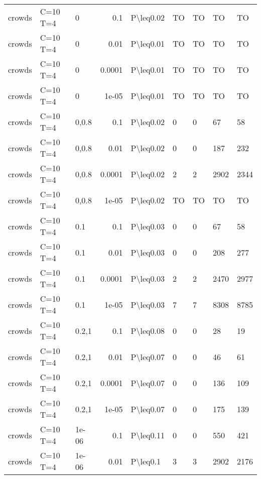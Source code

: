 \begin{longtable}{lllrlllll}
 crowds        & C=10 T=4  & 0     & 0.1    & P\textbackslash{}leq0.02  & TO   & TO   & TO       & TO      \\
 crowds        & C=10 T=4  & 0     & 0.01   & P\textbackslash{}leq0.01  & TO   & TO   & TO       & TO      \\
 crowds        & C=10 T=4  & 0     & 0.0001 & P\textbackslash{}leq0.01  & TO   & TO   & TO       & TO      \\
 crowds        & C=10 T=4  & 0     & 1e-05  & P\textbackslash{}leq0.01  & TO   & TO   & TO       & TO      \\
 crowds        & C=10 T=4  & 0,0.8 & 0.1    & P\textbackslash{}leq0.02  & 0    & 0    & 67       & 58      \\
 crowds        & C=10 T=4  & 0,0.8 & 0.01   & P\textbackslash{}leq0.02  & 0    & 0    & 187      & 232     \\
 crowds        & C=10 T=4  & 0,0.8 & 0.0001 & P\textbackslash{}leq0.02  & 2    & 2    & 2902     & 2344    \\
 crowds        & C=10 T=4  & 0,0.8 & 1e-05  & P\textbackslash{}leq0.02  & TO   & TO   & TO       & TO      \\
 crowds        & C=10 T=4  & 0.1   & 0.1    & P\textbackslash{}leq0.03  & 0    & 0    & 67       & 58      \\
 crowds        & C=10 T=4  & 0.1   & 0.01   & P\textbackslash{}leq0.03  & 0    & 0    & 208      & 277     \\
 crowds        & C=10 T=4  & 0.1   & 0.0001 & P\textbackslash{}leq0.03  & 2    & 2    & 2470     & 2977    \\
 crowds        & C=10 T=4  & 0.1   & 1e-05  & P\textbackslash{}leq0.03  & 7    & 7    & 8308     & 8785    \\
 crowds        & C=10 T=4  & 0.2,1 & 0.1    & P\textbackslash{}leq0.08  & 0    & 0    & 28       & 19      \\
 crowds        & C=10 T=4  & 0.2,1 & 0.01   & P\textbackslash{}leq0.07  & 0    & 0    & 46       & 61      \\
 crowds        & C=10 T=4  & 0.2,1 & 0.0001 & P\textbackslash{}leq0.07  & 0    & 0    & 136      & 109     \\
 crowds        & C=10 T=4  & 0.2,1 & 1e-05  & P\textbackslash{}leq0.07  & 0    & 0    & 175      & 139     \\
 crowds        & C=10 T=4  & 1e-06 & 0.1    & P\textbackslash{}leq0.11  & 0    & 0    & 550      & 421     \\
 crowds        & C=10 T=4  & 1e-06 & 0.01   & P\textbackslash{}leq0.1   & 3    & 3    & 2902     & 2176    \\

\end{longtable}
